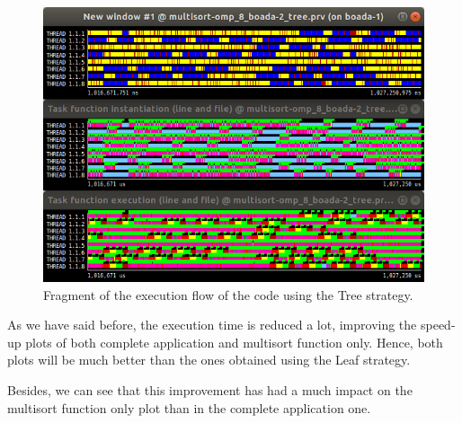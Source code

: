 \documentclass[12pt, a4paper]{article}
\begin{document}
\begin{figure}[H]
	\centering
	\includegraphics[scale=0.45]{./images/S2/Tree_paraver}
	
	\label{fig:tree_traces}
	\caption{Fragment of the execution flow of the code using the Tree strategy.}
\end{figure}

As we have said before, the execution time is reduced a lot, improving the speed-up plots of both complete application and multisort function only. Hence, both plots will be much better than the ones obtained using the Leaf strategy.

Besides, we can see that this improvement has had a much impact on the multisort function only plot than in the complete application one.
\end{document}
